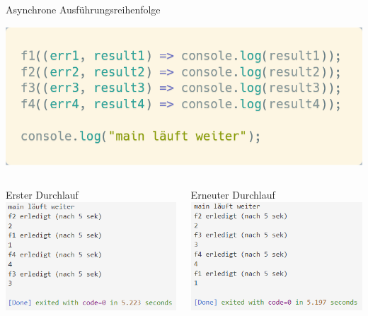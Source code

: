 \documentclass[t,handout]{beamer}
\begin{document}
\begin{frame}{Asynchrone Ausführungsreihenfolge}
  \begin{center}
    \includegraphics[scale=.28]{fig/async2.png}\\[.2cm]
    \begin{columns}
      \begin{column}{0.48\textwidth}
        Erster Durchlauf\\[.2cm]
        \includegraphics[scale=.5]{fig/async3.png}
      \end{column}
      \begin{column}{0.48\textwidth}
        Erneuter Durchlauf\\[.2cm]
        \includegraphics[scale=.5]{fig/async4.png}
      \end{column}
    \end{columns}
  \end{center}
\end{frame}
\end{document}
